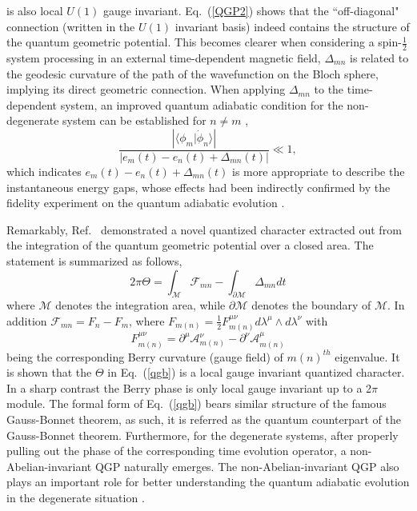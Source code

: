 \documentclass[aps,pra,twocolumn,
groupedaddress,10pt]{revtex4}
\def\be{\begin{equation}} \def\ee{\end{equation}}
\begin{document}
is also local $U(1)$ gauge invariant. Eq.~(\ref{QGP2}) shows that
the ``off-diagonal" connection (written in the $U(1)$ invariant basis)
indeed contains the structure of the quantum geometric potential.
This becomes clearer when considering a spin-$\frac{1}{2}$
system processing in an external time-dependent
magnetic field, $\Delta_{mn}$
is related to the geodesic curvature of the path of the wavefunction
on the Bloch sphere, implying its direct geometric connection.
When applying $\Delta_{mn}$ to the time-dependent system,
an improved quantum adiabatic condition for the non-degenerate system can be established
for $n\neq m$ \cite{Jianda2008,Zhang2010,Zhao2011},
\be
\frac{{\left| {\langle\phi_m|\dot{\phi}_n\rangle } \right|}}
{{\left| {e_m (t) - e_n (t) + \Delta _{mn} (t)} \right|}}
\ll 1 \label{eq:U1adia},
\ee
which indicates ${e_m (t) - e_n (t) + \Delta_{mn} (t)} $
is more appropriate to describe the instantaneous energy gaps, whose
effects had been indirectly confirmed by the fidelity experiment
on the quantum adiabatic evolution \cite{Du2008}.

Remarkably, Ref.~\cite{Xu2017} demonstrated
a novel quantized character extracted out from the integration
of the quantum geometric potential over a closed area. The statement is summarized
as follows,
\be
2\pi \Theta  = \int_\mathcal{M} \mathcal{F}_{mn}  - \int_{\partial \mathcal{M}} {\Delta_{mn} dt}
\label{qgb}
\ee
where $\mathcal{M}$ denotes the integration area, while ${\partial \mathcal{M}}$ denotes
the boundary of $\mathcal{M}$. In addition
$\mathcal{F}_{mn} = F_n -F _m $,
where $F_{m(n)} = \frac{1}{2}F_{m(n)}^{\mu\nu} d\lambda^{\mu}\wedge d\lambda^{\nu}$
with
\be
F^{\mu\nu}_{m(n)} = \partial^\mu
\mathcal{A}^{\nu}_{m(n)} - \partial^\nu \mathcal{A}^{\mu}_{m(n)} \label{berrycurvature1}
\ee
being the
corresponding Berry curvature (gauge field) of $m(n)^{th}$ eigenvalue. It is shown that
the $\Theta$ in Eq.~(\ref{qgb}) is a local gauge invariant quantized character.
In a sharp contrast the Berry phase is only local gauge invariant up to a 2$\pi$ module.
The formal form of Eq.~(\ref{qgb}) bears similar structure of the
famous Gauss-Bonnet theorem, as such, it is referred as
the quantum counterpart of the Gauss-Bonnet theorem.
Furthermore, for the degenerate systems, after
properly pulling out the phase of the corresponding time evolution operator,
a non-Abelian-invariant QGP naturally emerges.
The non-Abelian-invariant QGP also plays an important role for better understanding
the quantum adiabatic evolution in the degenerate situation \cite{Xu2017}.
\end{document}
